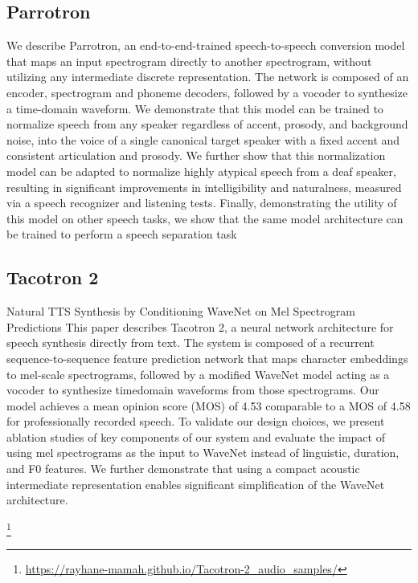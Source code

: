 \subsection{Parrotron}
\cite{biadsy2019parrotron}
We describe Parrotron, an end-to-end-trained speech-to-speech conversion model that maps an input spectrogram directly to another spectrogram, without utilizing any intermediate discrete representation. The network is composed of an encoder, spectrogram and phoneme decoders, followed by a vocoder to synthesize a time-domain waveform. We demonstrate that this model can be trained to normalize speech from any speaker regardless of accent, prosody, and background noise, into the voice of a single canonical target speaker with a fixed accent and consistent articulation and prosody. We further show that this normalization model can be adapted to normalize highly atypical speech from a deaf speaker, resulting in significant improvements in intelligibility and naturalness, measured via a speech recognizer and listening tests. Finally, demonstrating the utility of this model on other speech tasks, we show that the same model architecture can be trained to perform a speech separation task 



\subsection{Tacotron 2}
\cite{Shen2018NaturalTS}
Natural TTS Synthesis by Conditioning WaveNet on Mel Spectrogram Predictions
This paper describes Tacotron 2, a neural network architecture for speech synthesis directly from text. The system is composed of a recurrent sequence-to-sequence feature prediction network that maps character embeddings to mel-scale spectrograms, followed by a modified WaveNet model acting as a vocoder to synthesize timedomain waveforms from those spectrograms. Our model achieves a mean opinion score (MOS) of 4.53 comparable to a MOS of 4.58 for professionally recorded speech. To validate our design choices, we present ablation studies of key components of our system and evaluate the impact of using mel spectrograms as the input to WaveNet instead of linguistic, duration, and F0 features. We further demonstrate that using a compact acoustic intermediate representation enables significant simplification of the WaveNet architecture. 

\footnote{\url{https://rayhane-mamah.github.io/Tacotron-2_audio_samples/}}

